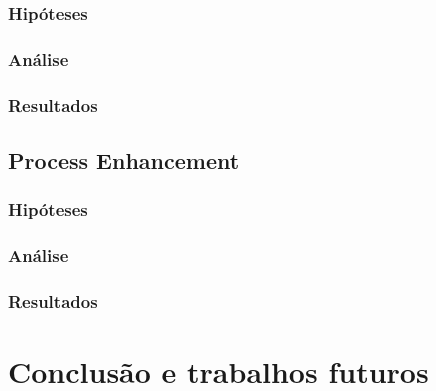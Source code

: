 \documentclass[a4paper]{article}
\begin{document}
\subsubsection{Hipóteses}
\subsubsection{Análise}
\subsubsection{Resultados}

\subsection{Process Enhancement}
\subsubsection{Hipóteses}
\subsubsection{Análise}
\subsubsection{Resultados}

\section{Conclusão e trabalhos futuros}
\end{document}
